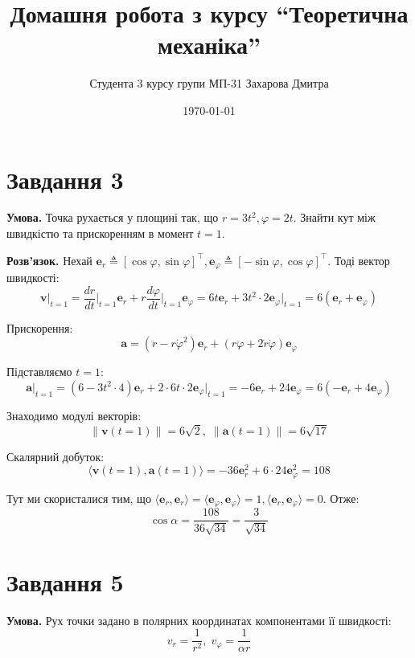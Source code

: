 \documentclass[12pt]{extarticle}
\title{Домашня робота з курсу ``Теоретична механіка''}
\author{Студента 3 курсу групи МП-31 Захарова Дмитра}
\date{\today}
\begin{document}
\maketitle

\section*{Завдання 3}

\textbf{Умова.} Точка рухається у площині так, що $r=3t^2,\varphi=2t$. Знайти кут між швидкістю та прискоренням в момент $t=1$.

\textbf{Розв'язок.} Нехай $\boldsymbol{e}_r \triangleq [\cos\varphi, \sin\varphi]^{\top}, \boldsymbol{e}_{\varphi} \triangleq [-\sin\varphi, \cos\varphi]^{\top}$. Тоді вектор швидкості:
\[
\boldsymbol{v}\Big|_{t=1} = \frac{dr}{dt}\Big|_{t=1}\boldsymbol{e}_r + r \frac{d\varphi}{dt}\Big|_{t=1}\boldsymbol{e}_\varphi = 6t\boldsymbol{e}_r + 3t^2 \cdot 2 \boldsymbol{e}_{\varphi}\Big|_{t=1} = 6(\boldsymbol{e}_r + \boldsymbol{e}_{\varphi})
\]

Прискорення:
\[
\boldsymbol{a} = (\ddot{r}-r\dot{\varphi}^2)\boldsymbol{e}_r + (r\ddot{\varphi} + 2\dot{r}\dot{\varphi})\boldsymbol{e}_{\varphi}
\]

Підставляємо $t=1$:
\[
\boldsymbol{a}\Big|_{t=1} = (6 - 3t^2 \cdot 4)\boldsymbol{e}_r + 2 \cdot 6t \cdot 2 \boldsymbol{e}_{\varphi}\Big|_{t=1} = -6\boldsymbol{e}_r + 24\boldsymbol{e}_{\varphi} = 6(-\boldsymbol{e}_r + 4\boldsymbol{e}_{\varphi})
\]

Знаходимо модулі векторів:
\[
\|\boldsymbol{v}(t=1)\| = 6\sqrt{2}, \; \|\boldsymbol{a}(t=1)\| = 6\sqrt{17}
\]

Скалярний добуток:
\[
\langle \boldsymbol{v}(t=1),\boldsymbol{a}(t=1) \rangle = -36\boldsymbol{e}_r^2 + 6 \cdot 24 \boldsymbol{e}_{\varphi}^2 = 108
\]

Тут ми скористалися тим, що $\langle\boldsymbol{e}_r,\boldsymbol{e}_r\rangle=\langle\boldsymbol{e}_{\varphi},\boldsymbol{e}_{\varphi}\rangle = 1, \langle\boldsymbol{e}_r,\boldsymbol{e}_{\varphi}\rangle = 0$. Отже:
\[
\cos \alpha = \frac{108}{36\sqrt{34}} = \frac{3}{\sqrt{34}}
\]

\section*{Завдання 5}

\textbf{Умова.} Рух точки задано в полярних координатах компонентами її швидкості:
\[
v_r = \frac{1}{r^2}, \; v_{\varphi} = \frac{1}{\alpha r}
\]
\end{document}

